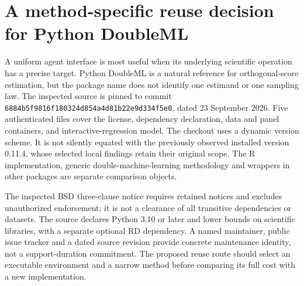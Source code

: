 \section{A method-specific reuse decision for Python DoubleML}
\label{exec23:doubleml-reuse-scope}
A uniform agent interface is most useful when its underlying scientific
operation has a precise target. Python DoubleML is a natural reference for
orthogonal-score estimation, but the package name does not identify one
estimand or one sampling law. The inspected source is pinned to commit
\texttt{6884b5f9816f180324d854a4d81b22e9d334f5e0}, dated 23 September 2026.
Five authenticated files cover the license, dependency declaration, data and
panel containers, and interactive-regression model. The checkout uses a dynamic
version scheme. It is not silently equated with the previously observed
installed version 0.11.4, whose selected local findings retain their original
scope. The R implementation, generic double-machine-learning methodology and
wrappers in other packages are separate comparison objects.
\citep{exec23_doubleml_reuse_source,sw_doubleml,runtime_doubleml_scope}

The inspected BSD three-clause notice requires retained notices and excludes
unauthorized endorsement; it is not a clearance of all transitive dependencies
or datasets. The source declares Python 3.10 or later and lower bounds on
scientific libraries, with a separate optional RD dependency. A named maintainer,
public issue tracker and a dated source revision provide concrete maintenance
identity, not a support-duration commitment. The proposed reuse route should
select an executable environment and a narrow method before comparing its
full cost with a new implementation.
\citep{exec23_doubleml_reuse_source}

